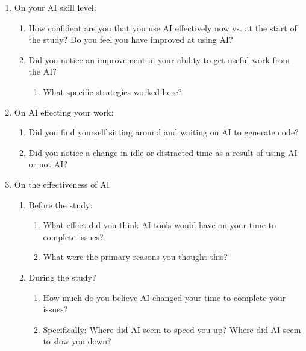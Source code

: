\documentclass{article}
\begin{document}
\begin{instructionbox}
\begin{enumerate}
\begin{enumerate}
        \item Did you increase the amount of AI that you used outside of the study as a result of the study?
        \item How did the study affect your belief in AI tools?
    \end{enumerate}
    \item On your AI skill level:
    \begin{enumerate}
        \item How confident are you that you use AI effectively now vs. at the start of the study? Do you feel you have improved at using AI?
        \item Did you notice an improvement in your ability to get useful work from the AI?
        \begin{enumerate}
            \item What specific strategies worked here?
        \end{enumerate}
    \end{enumerate}
    \item On AI effecting your work:
    \begin{enumerate}
        \item Did you find yourself sitting around and waiting on AI to generate code?
        \item Did you notice a change in idle or distracted time as a result of using AI or not AI?
    \end{enumerate}
    \item On the effectiveness of AI
    \begin{enumerate}
        \item Before the study:
        \begin{enumerate}
            \item What effect did you think AI tools would have on your time to complete issues? 
            \item What were the primary reasons you thought this?
        \end{enumerate}
        \item During the study?
        \begin{enumerate}
            \item How much do you believe AI changed your time to complete your issues?
            \item Specifically: Where did AI seem to speed you up? Where did AI seem to slow you down?
        \end{enumerate}
    \end{enumerate}

\end{enumerate}
\end{instructionbox}
\end{document}
